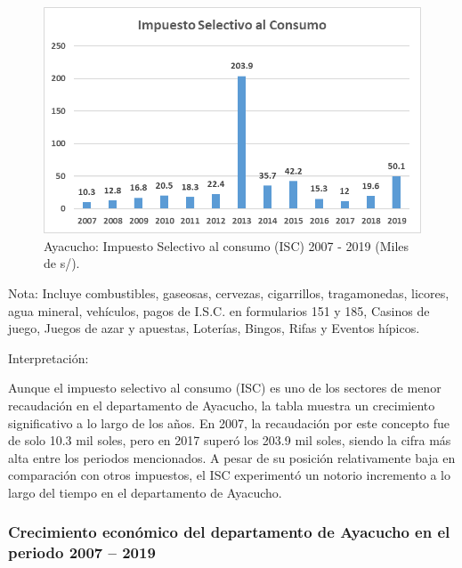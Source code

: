 \documentclass[
  letterpaper,
  DIV=11,
  numbers=noendperiod]{scrartcl}
\begin{document}
\begin{figure}

\caption{\label{fig-3}Ayacucho: Impuesto Selectivo al consumo (ISC) 2007
- 2019 (Miles de s/).}

{\centering \includegraphics{20230603225455.png}

}

\end{figure}

Nota: Incluye combustibles, gaseosas, cervezas, cigarrillos,
tragamonedas, licores, agua mineral, vehículos, pagos de I.S.C. en
formularios 151 y 185, Casinos de juego, Juegos de azar y apuestas,
Loterías, Bingos, Rifas y Eventos hípicos.

Interpretación:

Aunque el impuesto selectivo al consumo (ISC) es uno de los sectores de
menor recaudación en el departamento de Ayacucho, la tabla muestra un
crecimiento significativo a lo largo de los años. En 2007, la
recaudación por este concepto fue de solo 10.3 mil soles, pero en 2017
superó los 203.9 mil soles, siendo la cifra más alta entre los periodos
mencionados. A pesar de su posición relativamente baja en comparación
con otros impuestos, el ISC experimentó un notorio incremento a lo largo
del tiempo en el departamento de Ayacucho.

\hypertarget{crecimiento-econuxf3mico-del-departamento-de-ayacucho-en-el-periodo-2007-2019}{%
\subsubsection{Crecimiento económico del departamento de Ayacucho en el
periodo 2007 --
2019}\label{crecimiento-econuxf3mico-del-departamento-de-ayacucho-en-el-periodo-2007-2019}}
\end{document}
